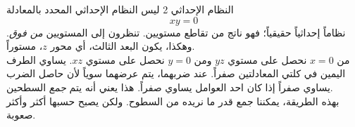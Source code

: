\begin{surferPage}[Coordinates II]{النظام الإحداثي 2}
ليس النظام الإحداثي المحدد بالمعادلة 
\[xy=0\]
نظاماً إحداثياً حقيقياً؛ فهو ناتج من تقاطع مستويين. تنظرون إلى المستويين {\it من فوق}. وهكذا، يكون البعد الثالث، أي محور $z$، مستوراً. \\
\vspace{0.3cm}
من $x=0$ نحصل على مستوي $yz$ ومن $y=0$ نحصل على مستوي $xz$. 
يساوي الطرف اليمين في كلتي المعادلتين صفراً. عند ضربهما، يتم عرضهما سوياً لأن حاصل الضرب يساوي صفراً إذا كان احد العوامل يساوي صفراً. هذا يعني أنه يتم {\it جمع} السطحين. \\
بهذه الطريقة، يمكننا جمع قدر ما نريده من السطوح. ولكن يصبح حسبها أكثر وأكثر صعوبة.
\end{surferPage}
